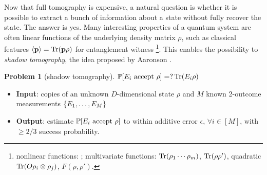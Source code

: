 \documentclass[
reprint,
aps,
pra,
floatfix,
]{revtex4-2}
\theoremstyle{plain}
\theoremstyle{definition}
\newtheorem{problem}{Problem}
\newcommand{\ob}{O}
\newcommand{\dm}{\rho}
\begin{document}
Now that full tomography is expensive, a natural question is whether it is possible to extract a bunch of information about a state without fully recover the state.
The answer is yes.
Many interesting properties of a quantum system are often linear functions of the underlying density matrix $\dm$, such as classical features $\expval{\vbp}=\Tr(\vbp \dm) $ for entanglement witness
\footnote{nonlinear functions: ;
multivariate functions:  $\Tr(\dm_1 \cdots \dm_m)$,  $\Tr(\dm\dm')$,  quadratic $\Tr(\ob \dm_i \otimes \dm_j)$,  $F(\dm,\dm')$.}.
This enables the possibility to \emph{shadow tomography}, the idea proposed by Aaronson \cite{aaronsonShadowTomographyQuantum2018}.
\begin{problem}[shadow tomography]\label{prm:shadow_tomography}
	$\probability[E_i \text{ accept } \dm]=?\Tr(E_i \dm)$
	\begin{itemize}
		\item \textbf{Input}: copies of an unknown $D$-dimensional state $\rho$ and $M$ known 2-outcome measurements $\qty{E_1,\dots,E_M}$
		\item \textbf{Output}: estimate $\probability[E_i \text{ accept } \dm]$ to within additive error $\epsilon$, $\forall i\in [M]$, with $\ge 2/3$ success probability.	
	\end{itemize}
\end{problem}
\end{document}
